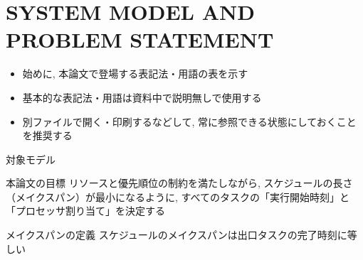 
\section{SYSTEM MODEL AND PROBLEM STATEMENT}
\label{sec: system model and problem statement}

\begin{frame}{}
    \begin{itemize}
        \item 始めに, 本論文で登場する表記法・用語の表を示す
        \item 基本的な表記法・用語は資料中で説明無しで使用する
        \item 別ファイルで開く・印刷するなどして, 常に参照できる状態にしておくことを推奨する
    \end{itemize}
\end{frame}



\begin{frame}{対象モデル}
\end{frame}

\begin{frame}{本論文の目標}
    リソースと優先順位の制約を満たしながら, スケジュールの長さ（メイクスパン）が最小になるように, すべてのタスクの「実行開始時刻」と「プロセッサ割り当て」を決定する
\end{frame}

\begin{frame}{メイクスパンの定義}
    スケジュールのメイクスパンは出口タスクの完了時刻に等しい
\end{frame}
